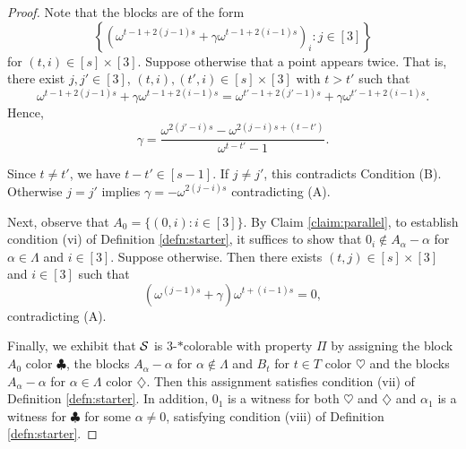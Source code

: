 \documentclass[draft, 11pt]{article}
\begin{document}
\begin{proof}
Note that the blocks are of the form
\begin{equation*}
\left\{\left(\omega^{t-1+2(j-1)s}+\gamma\omega^{t-1+2(i-1)s}\right)_i:j \in[3]\right\}
\end{equation*}
\noindent for $(t,i)\in [s]\times[3]$. Suppose otherwise that a
point appears twice. That is, there exist $j,j'\in [3]$,
$(t,i),(t',i)\in [s]\times [3]$ with $t>t'$ such that
\begin{equation*}
\omega^{t-1+2(j-1)s}+\gamma\omega^{t-1+2(i-1)s} 
=  \omega^{t'-1+2(j'-1)s}+\gamma\omega^{t'-1+2(i-1)s}.
\end{equation*}
Hence,
\begin{equation*}
\gamma=\frac{\omega^{2(j'-i)s}-\omega^{2(j-i)s+(t-t')}}{\omega^{t-t'}-1}.
\end{equation*}

Since $t\ne t'$, we have $t-t'\in [s-1]$. 
If $j\ne j'$, this contradicts Condition (B).
Otherwise $j=j'$ implies $\gamma=-\omega^{2(j-i)s}$ contradicting (A).



Next, observe that $A_0=\{(0,i): i\in [3]\}$. By
Claim \ref{claim:parallel}, to establish condition (vi) of Definition \ref{defn:starter}, 
it suffices to show
that $0_i\notin A_\alpha-\alpha$ for $\alpha\in\Lambda$
and $i\in[3]$. Suppose otherwise. Then there exists $(t,j)\in
[s] \times [3]$ and $i\in [3]$ such that
\begin{equation*}
(\omega^{(j-1)s}+\gamma)\omega^{t+(i-1)s}  = 0,
\end{equation*}
\noindent contradicting (A).



 Finally, we exhibit that $\mathcal S$ is $3$-$*$colorable with property $\Pi$ by assigning the block $A_0$ color $\clubsuit$,
 the blocks $A_\alpha-\alpha$ for $\alpha\notin\Lambda$ and $B_t$ for
 $t\in T$ color $\heartsuit$ and the blocks $A_\alpha-\alpha$ for
 $\alpha\in\Lambda$ color $\diamondsuit$. Then this assignment
 satisfies condition (vii) of Definition \ref{defn:starter}. In
 addition, $0_1$ is a witness for both $\heartsuit$ and
 $\diamondsuit$ and $\alpha_1$ is a witness for $\clubsuit$ for some
 $\alpha\ne 0$, satisfying condition (viii) of Definition
 \ref{defn:starter}.
 \end{proof}
\end{document}
